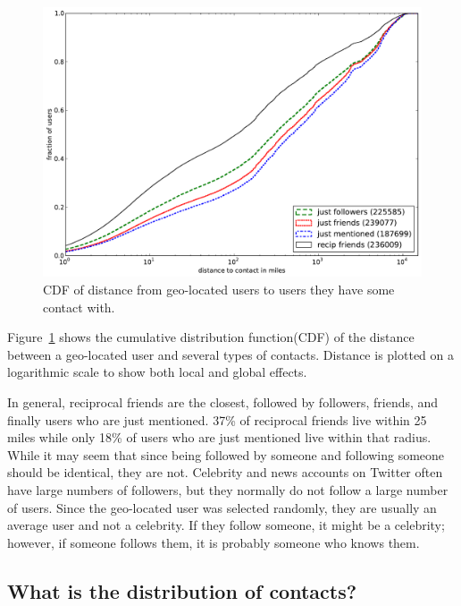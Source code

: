 \begin{figure}[tb]
\centering
\includegraphics[width=\linewidth]{figures/edge_types_cuml.pdf}
\caption{
CDF of distance from geo-located users to users they have some contact
with.
}
\label{fig:EdgeTypesCum}
\end{figure}

Figure~\ref{fig:EdgeTypesCum} shows the cumulative distribution
function(CDF) of the distance between a geo-located user and several types of
contacts.
%
Distance is plotted on a logarithmic scale to show both local and
global effects.

In general, reciprocal friends are the closest, followed by followers, friends,
and finally users who are just mentioned.
37\% of reciprocal friends live within 25 miles while only 18\% of users
who are just mentioned live within that radius.
While it may seem that since being followed by someone and following someone
should be identical, they are not.
Celebrity and news accounts on Twitter often have large numbers of followers,
but they normally do not follow a large number of users.
Since the geo-located user was selected randomly, they are usually an average
user and not a celebrity.
If they follow someone, it might be a celebrity; however, if someone follows
them, it is probably someone who knows them.

\subsection{What is the distribution of contacts?}

